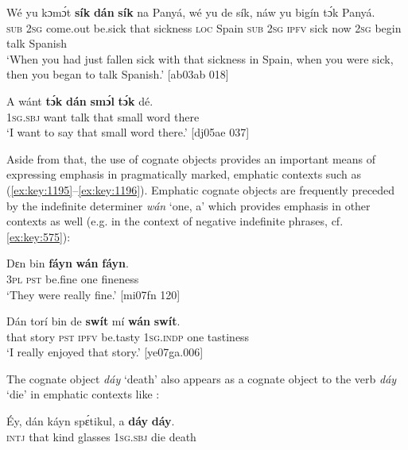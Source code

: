 \ea%
    \label{ex:key:1193}
    \gll Wé  yu  kɔmɔ́t    \textbf{sík}    \textbf{dán}  \textbf{sík}    na  Panyá,  wé  yu  de  sík,
náw    yu  bigín  tɔ́k  Panyá.\\
\textsc{sub}  \textsc{2sg}  come.out  be.sick  that  sickness  \textsc{loc}  Spain  \textsc{sub}  \textsc{2sg}  \textsc{ipfv}  sick
now    \textsc{2sg}  begin  talk  Spanish\\

\glt ‘When you had just fallen sick with that sickness in Spain, when you were sick, 
then you began to talk Spanish.’ [ab03ab 018]
\z


\ea%
    \label{ex:key:1194}
    \gll A    wánt  \textbf{tɔ́k}  \textbf{dán}  \textbf{smɔ́l}  \textbf{tɔ́k}    dé.\\
\textsc{1sg.sbj}  want  talk  that  small  word  there\\

\glt ‘I want to say that small word there.’ [dj05ae 037]
\z

Aside from that, the use of cognate objects provides an important means of expressing emphasis in pragmatically marked, emphatic contexts such as (\ref{ex:key:1195}–\ref{ex:key:1196}). Emphatic cognate objects are frequently preceded by the indefinite determiner \textit{wán} ‘one, a’ which provides emphasis in other contexts as well (e.g. in the context of negative indefinite phrases, cf. \ref{ex:key:575}):


\ea%
    \label{ex:key:1195}
    \gll Dɛn  bin  \textbf{fáyn}  \textbf{wán}    \textbf{fáyn}.\\
\textsc{3pl}  \textsc{pst}  be.fine  one    fineness  \\

\glt ‘They were really fine.’ [mi07fn 120]
\z


\ea%
    \label{ex:key:1196}
    \gll Dán    torí    bin  de  \textbf{swít}    mí    \textbf{wán}    \textbf{swít}.\\
that    story  \textsc{pst}  \textsc{ipfv}  be.tasty  \textsc{1sg.indp}  one    tastiness\\

\glt ‘I really enjoyed that story.’ [ye07ga.006]
\z

The cognate object \textit{dáy} ‘death’ also appears as a cognate object to the verb \textit{dáy} ‘die’ in emphatic contexts like :


\ea%
    \label{ex:key:1197}
    \gll \'{E}y,  dán  káyn  spɛ́tikul,  a    \textbf{dáy}  \textbf{dáy}.\\
\textsc{intj}  that  kind    glasses  \textsc{1sg.sbj}  die  death\\

